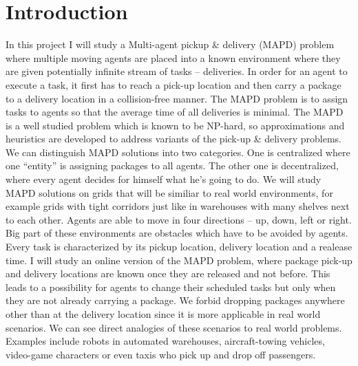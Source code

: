 \chapter*{Introduction}
In this project I will study a Multi-agent pickup \& delivery (MAPD) problem 
where multiple moving agents are placed into a known environment where they are
given potentially infinite stream
of tasks -- deliveries. In order for an agent to execute a task, it first has to
reach a pick-up location and then carry a package to a delivery location in a
collision-free manner. The
MAPD problem is to assign tasks to agents so that the average time of all 
deliveries is minimal.  The MAPD is a well studied problem which is known to be
NP-hard, so approximations and heuristics are developed to address variants of
the pick-up \& delivery problems. We can distinguish MAPD solutions into two
categories. One is centralized where one ``entity'' is assigning packages to
all agents. The other one is decentralized, where every agent decides for himself what
he's going to do. We will study MAPD solutions on grids that will be
similiar to real world environments, for example grids with tight corridors just
like in warehouses with many shelves next to each other. Agents are able to move
in four directions -- up, down, left or right. Big part of these environments
are obstacles which have to be avoided by agents. Every task is characterized by
its pickup location, delivery location and a realease time. I will study an
online version of the MAPD problem, where package pick-up and delivery locations
are known once they are released and not before. This leads to a possibility for
agents to change their scheduled tasks but only when they are not already carrying
a package. We forbid dropping packages anywhere other than at the delivery location
since it is more applicable in real world scenarios. 
We can see direct analogies of these scenarios to real 
world problems. Examples include robots in automated warehouses, 
aircraft-towing vehicles, video-game characters or even taxis who pick up and
drop off passengers.\cite{PDP}\cite{Liu}

